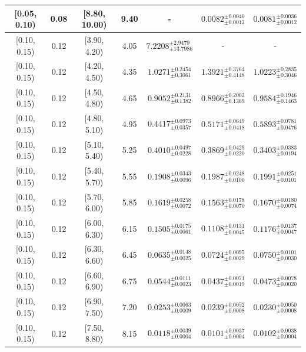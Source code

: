 \begin{longtable}{|c|c|c|c|c|c|c|}
\hline
[0.05, 0.10) & 0.08 & [8.80, 10.00) & 9.40 & - & $0.0082^{ \pm 0.0040 }_{ \pm 0.0012 }$ & $0.0081^{ \pm 0.0036 }_{ \pm 0.0012 }$ \\ 
\hline
[0.10, 0.15) & 0.12 & [3.90, 4.20) & 4.05 & $7.2208^{ \pm 2.9479 }_{ \pm 13.7986 }$ & - & - \\ 
\hline
[0.10, 0.15) & 0.12 & [4.20, 4.50) & 4.35 & $1.0271^{ \pm 0.2454 }_{ \pm 0.3061 }$ & $1.3921^{ \pm 0.3764 }_{ \pm 0.4148 }$ & $1.0223^{ \pm 0.2835 }_{ \pm 0.3046 }$ \\ 
\hline
[0.10, 0.15) & 0.12 & [4.50, 4.80) & 4.65 & $0.9052^{ \pm 0.2131 }_{ \pm 0.1382 }$ & $0.8966^{ \pm 0.2002 }_{ \pm 0.1369 }$ & $0.9584^{ \pm 0.1946 }_{ \pm 0.1463 }$ \\ 
\hline
[0.10, 0.15) & 0.12 & [4.80, 5.10) & 4.95 & $0.4417^{ \pm 0.0973 }_{ \pm 0.0357 }$ & $0.5171^{ \pm 0.0649 }_{ \pm 0.0418 }$ & $0.5893^{ \pm 0.0781 }_{ \pm 0.0476 }$ \\ 
\hline
[0.10, 0.15) & 0.12 & [5.10, 5.40) & 5.25 & $0.4010^{ \pm 0.0497 }_{ \pm 0.0228 }$ & $0.3869^{ \pm 0.0429 }_{ \pm 0.0220 }$ & $0.3403^{ \pm 0.0383 }_{ \pm 0.0194 }$ \\ 
\hline
[0.10, 0.15) & 0.12 & [5.40, 5.70) & 5.55 & $0.1908^{ \pm 0.0343 }_{ \pm 0.0096 }$ & $0.1987^{ \pm 0.0248 }_{ \pm 0.0100 }$ & $0.1991^{ \pm 0.0251 }_{ \pm 0.0101 }$ \\ 
\hline
[0.10, 0.15) & 0.12 & [5.70, 6.00) & 5.85 & $0.1619^{ \pm 0.0258 }_{ \pm 0.0072 }$ & $0.1563^{ \pm 0.0178 }_{ \pm 0.0070 }$ & $0.1670^{ \pm 0.0180 }_{ \pm 0.0074 }$ \\ 
\hline
[0.10, 0.15) & 0.12 & [6.00, 6.30) & 6.15 & $0.1505^{ \pm 0.0175 }_{ \pm 0.0061 }$ & $0.1108^{ \pm 0.0131 }_{ \pm 0.0045 }$ & $0.1176^{ \pm 0.0137 }_{ \pm 0.0047 }$ \\ 
\hline
[0.10, 0.15) & 0.12 & [6.30, 6.60) & 6.45 & $0.0635^{ \pm 0.0148 }_{ \pm 0.0025 }$ & $0.0724^{ \pm 0.0095 }_{ \pm 0.0029 }$ & $0.0750^{ \pm 0.0101 }_{ \pm 0.0030 }$ \\ 
\hline
[0.10, 0.15) & 0.12 & [6.60, 6.90) & 6.75 & $0.0544^{ \pm 0.0111 }_{ \pm 0.0023 }$ & $0.0437^{ \pm 0.0071 }_{ \pm 0.0019 }$ & $0.0473^{ \pm 0.0078 }_{ \pm 0.0020 }$ \\ 
\hline
[0.10, 0.15) & 0.12 & [6.90, 7.50) & 7.20 & $0.0253^{ \pm 0.0063 }_{ \pm 0.0009 }$ & $0.0239^{ \pm 0.0052 }_{ \pm 0.0008 }$ & $0.0230^{ \pm 0.0050 }_{ \pm 0.0008 }$ \\ 
\hline
[0.10, 0.15) & 0.12 & [7.50, 8.80) & 8.15 & $0.0118^{ \pm 0.0039 }_{ \pm 0.0004 }$ & $0.0101^{ \pm 0.0037 }_{ \pm 0.0004 }$ & $0.0102^{ \pm 0.0038 }_{ \pm 0.0004 }$ \\ 

\end{longtable}
